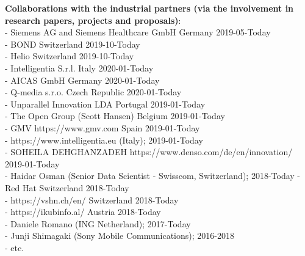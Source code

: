 \documentclass[12pt]{article}
\begin{document}

\textbf{Collaborations with the industrial partners (via the involvement in research papers, projects and proposals)}:\\
- Siemens AG and Siemens Healthcare GmbH	Germany	2019-05-Today\\
- BOND	Switzerland	2019-10-Today\\
- Helio	Switzerland	2019-10-Today\\
- Intelligentia S.r.l.	Italy	2020-01-Today\\
- AICAS GmbH	Germany	2020-01-Today\\
- Q-media s.r.o.	Czech Republic	2020-01-Today\\
- Unparallel Innovation LDA	Portugal	2019-01-Today\\
- The Open Group (Scott Hansen) Belgium 2019-01-Today\\
- GMV https://www.gmv.com Spain 2019-01-Today\\
- https://www.intelligentia.eu (Italy); 2019-01-Today\\
- SOHEILA DEHGHANZADEH https://www.denso.com/de/en/innovation/ 2019-01-Today\\
- Haidar Osman (Senior Data Scientist - Swisscom, Switzerland); 2018-Today
- Red Hat Switzerland 2018-Today\\
- https://vshn.ch/en/ Switzerland 2018-Today\\
- https://ikubinfo.al/ Austria 2018-Today\\
- Daniele Romano (ING Netherland); 2017-Today\\
- Junji Shimagaki (Sony Mobile Communications); 2016-2018\\
- etc.
\end{document}
